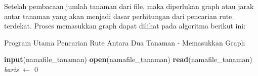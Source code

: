 \documentclass [conference] {IEEEtran}
\begin{document}
Setelah pembacaan jumlah tanaman dari file, maka diperlukan graph atau jarak antar tanaman yang akan menjadi dasar perhitungan dari pencarian rute terdekat. Proses memasukkan graph dapat dilihat pada algoritma berikut ini:
\begin{algorithm}
\caption{Program Utama Pencarian Rute Antara Dua Tanaman - Memasukkan Graph}\label{alg:two}
\textbf{input}({\selectfont namafile\_tanaman})\;
\textbf{open}({\selectfont namafile\_tanaman})\;
\textbf{read}({\selectfont namafile\_tanaman})\;
\textit{baris} $\gets$ 0\;
\end{algorithm}
\end{document}
